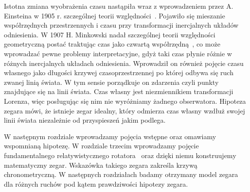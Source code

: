 Istotna zmiana wyobrażenia czasu nastąpiła wraz z wprowadzeniem przez 
A. Einsteina w 1905 r. szczególnej teorii względności~\cite{einstein}.
Pojawiło się mieszanie współrzędnych 
przestrzennych i czasu przy transformacji 
inercjalnych układów odniesienia. 
W 1907 H. Minkowski nadał szczególnej teorii względności 
geometryczną postać traktując czas jako czwartą 
współrzędną~\cite{minkowski2013space}, co może 
wprowadzać pewne problemy interpretacyjne, gdyż taki 
czas płynie różnie w różnych inercjalnych 
układach odniesienia.
Wprowadził on również pojęcie czasu własnego jako długości 
krzywej czasoprzestrzennej po której odbywa się ruch zwanej linią świata.
W tym sensie porządkuje on zdarzenia czyli punkty znajdujące
się na linii świata.
Czas własny jest niezmiennikiem transformacji Lorenza, 
więc posługując się
nim nie wyróżniamy żadnego obserwatora.
Hipoteza zegara
mówi, że istnieje zegar idealny, który odmierza czas własny 
wzdłuż swojej linii świata niezależnie od przyspieszeń 
jakim podlega.

W następnym rozdziale wprowadzamy pojęcia wstępne oraz omawiamy 
wspomnianą hipotezę. W rozdziale trzecim wprowadzamy pojęcie 
fundamentalnego relatywistycznego rotatora~\cite{star2008} oraz 
dzięki niemu konstruujemy matematyczny zegar. 
Wskazówka takiego zegara zakreśla krzywą chronometryczną.
W następnych rozdziałach badamy otrzymany model zegara
dla różnych ruchów pod kątem prawdziwości hipotezy zegara.
